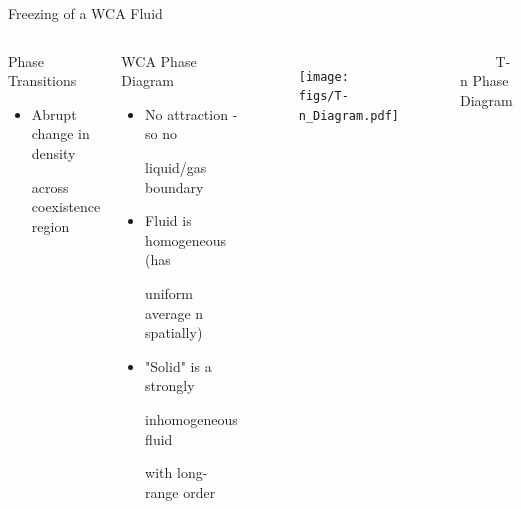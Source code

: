 \documentclass{beamer}
\begin{document}
\begin{frame}{Freezing of a WCA Fluid}
	\begin{columns}[t]
	    \vspace{-1em}
		\begin{block}{Phase Transitions}
		     \begin{itemize}
				\item Abrupt change in density
				
				across coexistence region
			 \end{itemize}		
		\end{block} 
		\begin{block}{WCA Phase Diagram}
		     \begin{itemize}
				\item No attraction	- so no
				
				liquid/gas boundary
				\item Fluid is homogeneous (has
				
				uniform average n spatially) 
				\item "Solid" is a strongly 
				
				inhomogeneous fluid 
				
				with long-range order		
			  \end{itemize}				 
		\end{block}			       
	    \vspace{-2em}
		 \begin{figure}
            \centering
            \texttt{[image: figs/T-n\_Diagram.pdf]}
          \end{figure}
          \vspace{-1em}
         $~~~~~~~~~~$ T-n Phase Diagram  
       
	\end{columns}
    \vspace{+1em}
\end{frame}
\end{document}
